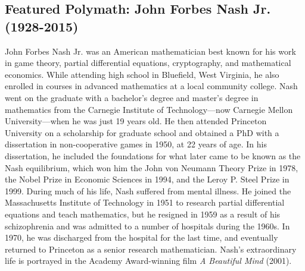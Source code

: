 \documentclass[12pt]{article}
\theoremstyle{definition}
\begin{document}
\subsection*{Featured Polymath: John Forbes Nash Jr. (1928-2015)}
John Forbes Nash Jr. was an American mathematician best known for his work in game theory, partial differential equations, cryptography, and mathematical economics. While attending high school in Bluefield, West Virginia, he also enrolled in courses in advanced mathematics at a local community college. Nash went on the graduate with a bachelor’s degree and master’s degree in mathematics from the Carnegie Institute of Technology—now Carnegie Mellon University—when he was just 19 years old. He then attended Princeton University on a scholarship for graduate school and obtained a PhD with a dissertation in non-cooperative games in 1950, at 22 years of age. In his dissertation, he included the foundations for what later came to be known as the Nash equilibrium, which won him the John von Neumann Theory Prize in 1978, the Nobel Prize in Economic Sciences in 1994, and the Leroy P. Steel Prize in 1999. During much of his life, Nash suffered from mental illness. He joined the Massachusetts Institute of Technology in 1951 to research partial differential equations and teach mathematics, but he resigned in 1959 as a result of his schizophrenia and was admitted to a number of hospitals during the 1960s. In 1970, he was discharged from the hospital for the last time, and eventually returned to Princeton as a senior research mathematician. Nash’s extraordinary life is portrayed in the Academy Award-winning film \emph{A Beautiful Mind} (2001).
\newpage


\def\currentTitleWallpaper{2021_Pure_Math_Title_Page_Border.pdf}



\newpage



\newpage



\newpage

\def\currentTitleWallpaper{2021_Applied_Math_Title_Page_Border.pdf}
\end{document}
